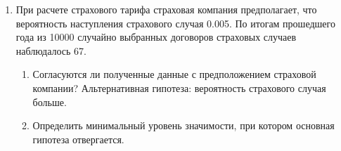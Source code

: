 \begin{enumerate}
\item При расчете страхового тарифа страховая компания предполагает, что вероятность наступления страхового случая 0.005. По итогам прошедшего года из 10000 случайно выбранных договоров страховых случаев наблюдалось 67.
\begin{enumerate}
\item Согласуются ли полученные данные с предположением страховой компании? Альтернативная гипотеза: вероятность страхового случая больше.
\item Определить минимальный уровень значимости, при котором основная гипотеза отвергается.
\end{enumerate}
\end{enumerate}
